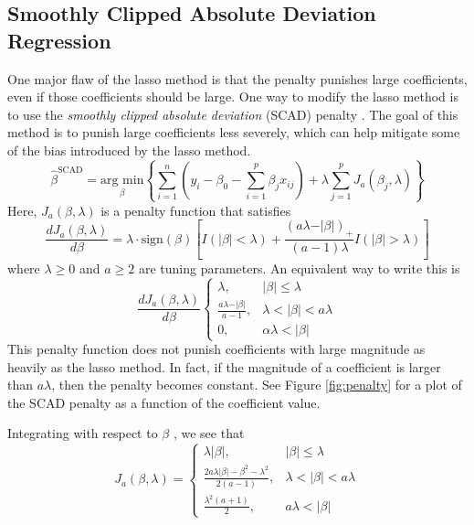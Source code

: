 \documentclass{article}
\newcommand{\argmin}[1]{\underset{\beta}{\text{arg min}}}
\newcommand{\sign}{\text{sign}}
\begin{document}
\subsection{Smoothly Clipped Absolute Deviation Regression}
One major flaw of the lasso method is that the penalty punishes large coefficients, even if those coefficients should be large. One way to modify the lasso method is to use the \textit{smoothly clipped absolute deviation} (SCAD) penalty \cite{fan2001variable}. The goal of this method is to punish large coefficients less severely, which can help mitigate some of the bias introduced by the lasso method.
\begin{equation}
	\hat{\beta}^{\text{SCAD}}=\argmin{\beta}\left\{ \sum\limits_{i = 1}^n \left( y_i - \beta_0 - \sum\limits_{i = 1}^p \beta_j x_{ij} \right) + \lambda\sum\limits_{j = 1}^p J_a(\beta_j, \lambda) \right\}
\end{equation}
Here, $J_a(\beta, \lambda)$ is a penalty function that satisfies
\begin{equation}
	\frac{dJ_a(\beta, \lambda)}{d\beta} = \lambda\cdot\sign(\beta)\left[ I(\vert \beta \vert<\lambda) + \frac{(a\lambda - \vert \beta\vert)_+}{(a - 1)\lambda}I(\vert \beta \vert > \lambda) \right]
\end{equation}
where $\lambda \geq 0$ and $a\geq 2$ are tuning parameters. An equivalent way to write this is
\begin{equation}
	\frac{dJ_a(\beta, \lambda)}{d\beta}\left\{\begin{array}{ll}
		\lambda,&\vert \beta \vert\leq \lambda\\
		\frac{a\lambda - \vert \beta \vert}{a - 1},&\lambda < \vert \beta \vert < a\lambda\\
		0,&\alpha\lambda < \vert \beta \vert
	\end{array}\right.
\end{equation}
This penalty function does not punish coefficients with large magnitude as heavily as the lasso method. In fact, if the magnitude of a coefficient is larger than $a\lambda$, then the penalty becomes constant. See Figure \ref{fig:penalty} for a plot of the SCAD penalty as a function of the coefficient value.

Integrating with respect to $\beta$ \cite{breheny2016lasso}, we see that
\begin{equation}
	J_a(\beta, \lambda) = \left\{\begin{array}{ll}
		\lambda \vert \beta \vert,&\vert \beta \vert \leq \lambda\\
		\frac{2a\lambda\vert\beta\vert - \beta^2-\lambda^2}{2(a - 1)},&\lambda < \vert \beta \vert < a\lambda\\
		\frac{\lambda^2(a + 1)}{2},&a\lambda < \vert \beta \vert
	\end{array}\right.
\end{equation}
\end{document}
